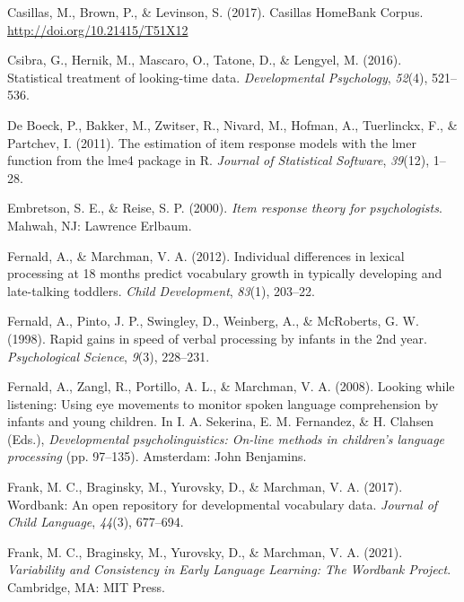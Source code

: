 \documentclass[10pt, letterpaper]{article}
\begin{document}
\leavevmode\hypertarget{ref-Casillas2017}{}%
Casillas, M., Brown, P., \& Levinson, S. (2017). Casillas HomeBank
Corpus. \url{http://doi.org/10.21415/T51X12}

\leavevmode\hypertarget{ref-Csibra2016}{}%
Csibra, G., Hernik, M., Mascaro, O., Tatone, D., \& Lengyel, M. (2016).
Statistical treatment of looking-time data. \emph{Developmental
Psychology}, \emph{52}(4), 521--536.

\leavevmode\hypertarget{ref-de-boeck2011}{}%
De Boeck, P., Bakker, M., Zwitser, R., Nivard, M., Hofman, A.,
Tuerlinckx, F., \& Partchev, I. (2011). The estimation of item response
models with the lmer function from the lme4 package in R. \emph{Journal
of Statistical Software}, \emph{39}(12), 1--28.

\leavevmode\hypertarget{ref-embretson2000}{}%
Embretson, S. E., \& Reise, S. P. (2000). \emph{Item response theory for
psychologists}. Mahwah, NJ: Lawrence Erlbaum.

\leavevmode\hypertarget{ref-Fernald2012a}{}%
Fernald, A., \& Marchman, V. A. (2012). Individual differences in
lexical processing at 18 months predict vocabulary growth in typically
developing and late-talking toddlers. \emph{Child Development},
\emph{83}(1), 203--22.

\leavevmode\hypertarget{ref-fernald1998}{}%
Fernald, A., Pinto, J. P., Swingley, D., Weinberg, A., \& McRoberts, G.
W. (1998). Rapid gains in speed of verbal processing by infants in the
2nd year. \emph{Psychological Science}, \emph{9}(3), 228--231.

\leavevmode\hypertarget{ref-Fernald2008}{}%
Fernald, A., Zangl, R., Portillo, A. L., \& Marchman, V. A. (2008).
Looking while listening: Using eye movements to monitor spoken language
comprehension by infants and young children. In I. A. Sekerina, E. M.
Fernandez, \& H. Clahsen (Eds.), \emph{Developmental psycholinguistics:
On-line methods in children's language processing} (pp. 97--135).
Amsterdam: John Benjamins.

\leavevmode\hypertarget{ref-Frank2016}{}%
Frank, M. C., Braginsky, M., Yurovsky, D., \& Marchman, V. A. (2017).
Wordbank: An open repository for developmental vocabulary data.
\emph{Journal of Child Language}, \emph{44}(3), 677--694.

\leavevmode\hypertarget{ref-frank2021}{}%
Frank, M. C., Braginsky, M., Yurovsky, D., \& Marchman, V. A. (2021).
\emph{Variability and Consistency in Early Language Learning: The
Wordbank Project}. Cambridge, MA: MIT Press.
\end{document}
